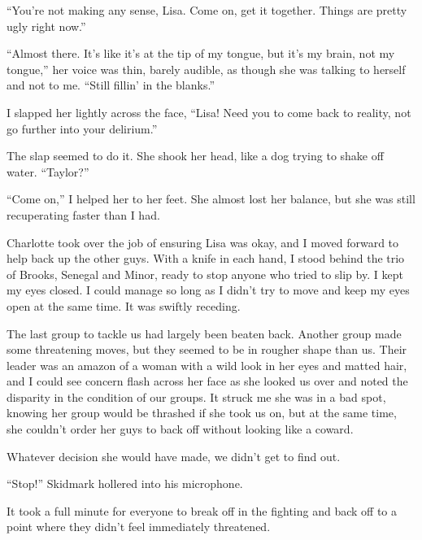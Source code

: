 ``You're not making any sense, Lisa.  Come on, get it together.  Things are pretty ugly right now.''



``Almost there.  It's like it's at the tip of my tongue, but it's my brain, not my tongue,'' her voice was thin, barely audible, as though she was talking to herself and not to me.  ``Still fillin' in the blanks.''



I slapped her lightly across the face, ``Lisa!  Need you to come back to reality, not go further into your delirium.''



The slap seemed to do it.  She shook her head, like a dog trying to shake off water.  ``Taylor?''



``Come on,'' I helped her to her feet.  She almost lost her balance, but she was still recuperating faster than I had.



Charlotte took over the job of ensuring Lisa was okay, and I moved forward to help back up the other guys.  With a knife in each hand, I stood behind the trio of Brooks, Senegal and Minor, ready to stop anyone who tried to slip by.  I kept my eyes closed.  I could manage so long as I didn't try to move and keep my eyes open at the same time.  It was swiftly receding.



The last group to tackle us had largely been beaten back.  Another group made some threatening moves, but they seemed to be in rougher shape than us.  Their leader was an amazon of a woman with a wild look in her eyes and matted hair, and I could see concern flash across her face as she looked us over and noted the disparity in the condition of our groups.  It struck me she was in a bad spot, knowing her group would be thrashed if she took us on, but at the same time, she couldn't order her guys to back off without looking like a coward.



Whatever decision she would have made, we didn't get to find out.



``Stop!'' Skidmark hollered into his microphone.



It took a full minute for everyone to break off in the fighting and back off to a point where they didn't feel immediately threatened.




